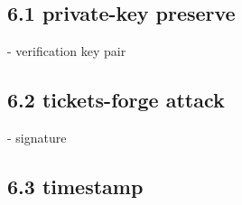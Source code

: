 \subsection*{6.1 private-key preserve}
- verification key pair

\subsection*{6.2 tickets-forge attack}
- signature

\subsection*{6.3 timestamp}




